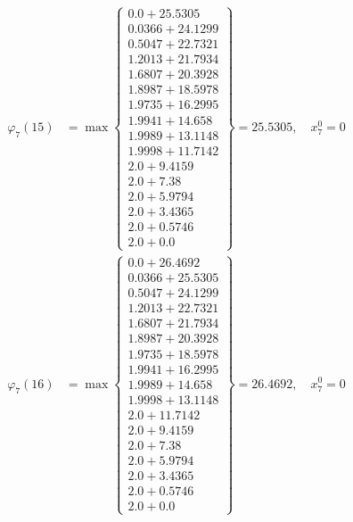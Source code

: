 \documentclass{article}
\begin{document}
\begin{align*}
  
\varphi_{7}(15) &= \max \left\{ \begin{array}{c}
0.0 + 25.5305 \\
 0.0366 + 24.1299 \\
 0.5047 + 22.7321 \\
 1.2013 + 21.7934 \\
 1.6807 + 20.3928 \\
 1.8987 + 18.5978 \\
 1.9735 + 16.2995 \\
 1.9941 + 14.658 \\
 1.9989 + 13.1148 \\
 1.9998 + 11.7142 \\
 2.0 + 9.4159 \\
 2.0 + 7.38 \\
 2.0 + 5.9794 \\
 2.0 + 3.4365 \\
 2.0 + 0.5746 \\
 2.0 + 0.0
\end{array} \right\}=25.5305,\quad x_{7}^0=0\\
  
  
  
  
\varphi_{7}(16) &= \max \left\{ \begin{array}{c}
0.0 + 26.4692 \\
 0.0366 + 25.5305 \\
 0.5047 + 24.1299 \\
 1.2013 + 22.7321 \\
 1.6807 + 21.7934 \\
 1.8987 + 20.3928 \\
 1.9735 + 18.5978 \\
 1.9941 + 16.2995 \\
 1.9989 + 14.658 \\
 1.9998 + 13.1148 \\
 2.0 + 11.7142 \\
 2.0 + 9.4159 \\
 2.0 + 7.38 \\
 2.0 + 5.9794 \\
 2.0 + 3.4365 \\
 2.0 + 0.5746 \\
 2.0 + 0.0
\end{array} \right\}=26.4692,\quad x_{7}^0=0\\
  
  
  

\end{align*}
\end{document}
